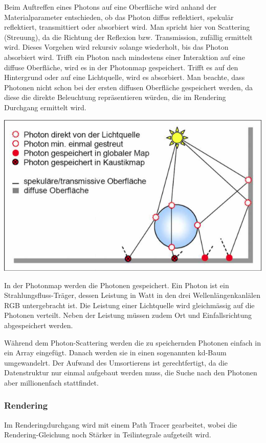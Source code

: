 \documentclass[10pt]{article}
\begin{document}
Beim Auftreffen eines Photons auf eine Oberfläche wird anhand der Materialparameter entschieden, ob das Photon diffus reflektiert, spekulär reflektiert, transmittiert oder absorbiert wird. Man spricht hier von Scattering (Streuung), da die Richtung der Reflexion bzw. Transmission, zufällig ermittelt wird. Dieses Vorgehen wird rekursiv solange wiederholt, bis das Photon absorbiert wird. Trifft ein Photon nach mindestens einer Interaktion auf eine diffuse Oberfläche, wird es in der Photonmap gespeichert. Trifft es auf den Hintergrund oder auf eine Lichtquelle, wird es absorbiert. Man beachte, dass Photonen nicht schon bei der ersten diffusen Oberfläche gespeichert werden, da diese die direkte Beleuchtung repräsentieren würden, die im Rendering Durchgang ermittelt wird.
\begin{center}
	\includegraphics[scale=0.4]{photon-scattering.png}
\end{center}

In der Photonmap werden die Photonen gespeichert. Ein Photon ist ein Strahlungsfluss-Träger, dessen Leistung in Watt in den drei Wellenlängenkanlälen RGB untergebracht ist. Die Leistung einer Lichtquelle wird gleichmässig auf die Photonen verteilt. Neben der Leistung müssen zudem Ort und Einfallsrichtung abgespeichert werden.

Während dem Photon-Scattering werden die zu speichernden Photonen einfach in ein Array eingefügt. Danach werden sie in einen sogenannten kd-Baum umgewandelrt. Der Aufwand des Umsortierens ist gerechtfertigt, da die Datenstruktur nur einmal aufgebaut werden muss, die Suche nach den Photonen aber millionenfach stattfindet.
\subsubsection{Rendering}
Im Renderingdurchgang wird mit einem Path Tracer gearbeitet, wobei die Rendering-Gleichung noch Stärker in Teilintegrale aufgeteilt wird.
\end{document}
